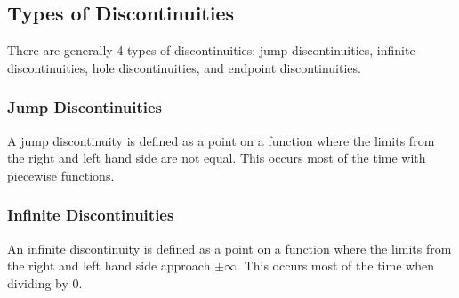 \documentclass[11pt]{article}
\begin{document}
\subsection{Types of Discontinuities}
There are generally 4 types of discontinuities: jump discontinuities, infinite discontinuities, hole discontinuities, and endpoint discontinuities. 

\subsubsection*{Jump Discontinuities}
A jump discontinuity is defined as a point on a function where the limits from the right and left hand side are not equal. This occurs most of the time with piecewise functions.

\begin{center}
\end{center}

\subsubsection*{Infinite Discontinuities}
An infinite discontinuity is defined as a point on a function where the limits from the right and left hand side approach $\pm\infty$. This occurs most of the time when dividing by $0$.

\begin{center}
\end{center}
\end{document}
